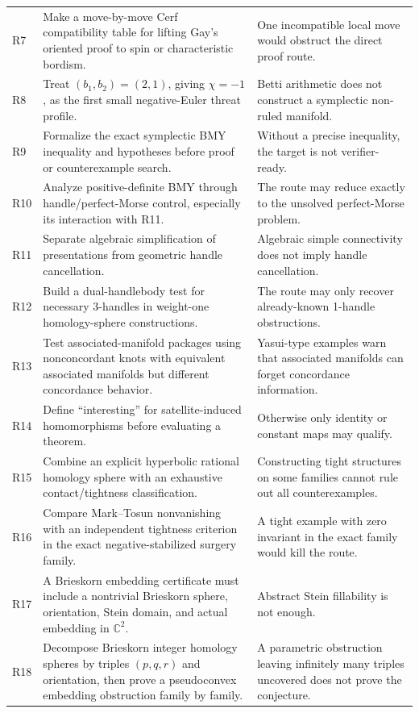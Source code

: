 \documentclass{article}
\theoremstyle{definition}
\theoremstyle{remark}
\begin{document}
\begin{table}[t]
\begin{scriptsize}
\begin{tabular}{p{}p{}p{}}
    R7 & Make a move-by-move Cerf compatibility table for lifting Gay's oriented proof to spin or characteristic bordism. & One incompatible local move would obstruct the direct proof route. \\
    R8 & Treat \((b_1,b_2)=(2,1)\), giving \(\chi=-1\), as the first small negative-Euler threat profile. & Betti arithmetic does not construct a symplectic non-ruled manifold. \\
    R9 & Formalize the exact symplectic BMY inequality and hypotheses before proof or counterexample search. & Without a precise inequality, the target is not verifier-ready. \\
    R10 & Analyze positive-definite BMY through handle/perfect-Morse control, especially its interaction with R11. & The route may reduce exactly to the unsolved perfect-Morse problem. \\
    R11 & Separate algebraic simplification of presentations from geometric handle cancellation. & Algebraic simple connectivity does not imply handle cancellation. \\
    R12 & Build a dual-handlebody test for necessary 3-handles in weight-one homology-sphere constructions. & The route may only recover already-known 1-handle obstructions. \\
    R13 & Test associated-manifold packages using nonconcordant knots with equivalent associated manifolds but different concordance behavior. & Yasui-type examples warn that associated manifolds can forget concordance information. \\
    R14 & Define ``interesting'' for satellite-induced homomorphisms before evaluating a theorem. & Otherwise only identity or constant maps may qualify. \\
    R15 & Combine an explicit hyperbolic rational homology sphere with an exhaustive contact/tightness classification. & Constructing tight structures on some families cannot rule out all counterexamples. \\
    R16 & Compare Mark--Tosun nonvanishing with an independent tightness criterion in the exact negative-stabilized surgery family. & A tight example with zero invariant in the exact family would kill the route. \\
    R17 & A Brieskorn embedding certificate must include a nontrivial Brieskorn sphere, orientation, Stein domain, and actual embedding in \(\mathbb{C}^2\). & Abstract Stein fillability is not enough. \\
    R18 & Decompose Brieskorn integer homology spheres by triples \((p,q,r)\) and orientation, then prove a pseudoconvex embedding obstruction family by family. & A parametric obstruction leaving infinitely many triples uncovered does not prove the conjecture. \\

\end{tabular}
\end{scriptsize}
\end{table}
\end{document}
